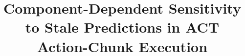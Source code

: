\documentclass[letterpaper, 10 pt, conference]{ieeeconf}
\title{\LARGE \bf
Component-Dependent Sensitivity to Stale Predictions in ACT Action-Chunk Execution
}
\author{}
\begin{document}
\maketitle
\thispagestyle{empty}
\pagestyle{empty}

\begin{abstract}

\end{abstract}











\end{document}
